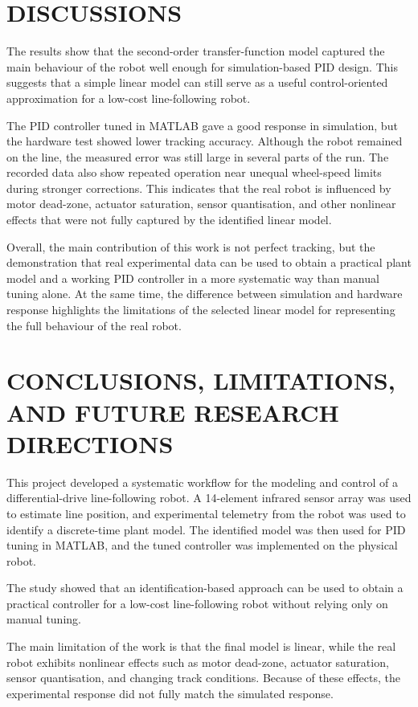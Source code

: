 \documentclass[a4paper,12pt,oneside]{book}
\begin{document}
\newpage
\chapter{DISCUSSIONS}

The results show that the second-order transfer-function model captured the main behaviour of the robot well enough for simulation-based PID design. This suggests that a simple linear model can still serve as a useful control-oriented approximation for a low-cost line-following robot.

The PID controller tuned in MATLAB gave a good response in simulation, but the hardware test showed lower tracking accuracy. Although the robot remained on the line, the measured error was still large in several parts of the run. The recorded data also show repeated operation near unequal wheel-speed limits during stronger corrections. This indicates that the real robot is influenced by motor dead-zone, actuator saturation, sensor quantisation, and other nonlinear effects that were not fully captured by the identified linear model.

Overall, the main contribution of this work is not perfect tracking, but the demonstration that real experimental data can be used to obtain a practical plant model and a working PID controller in a more systematic way than manual tuning alone. At the same time, the difference between simulation and hardware response highlights the limitations of the selected linear model for representing the full behaviour of the real robot.
\newpage
\chapter{CONCLUSIONS, LIMITATIONS, AND FUTURE RESEARCH DIRECTIONS}

This project developed a systematic workflow for the modeling and control of a differential-drive line-following robot. A 14-element infrared sensor array was used to estimate line position, and experimental telemetry from the robot was used to identify a discrete-time plant model. The identified model was then used for PID tuning in MATLAB, and the tuned controller was implemented on the physical robot.

The study showed that an identification-based approach can be used to obtain a practical controller for a low-cost line-following robot without relying only on manual tuning.

The main limitation of the work is that the final model is linear, while the real robot exhibits nonlinear effects such as motor dead-zone, actuator saturation, sensor quantisation, and changing track conditions. Because of these effects, the experimental response did not fully match the simulated response.
\end{document}
